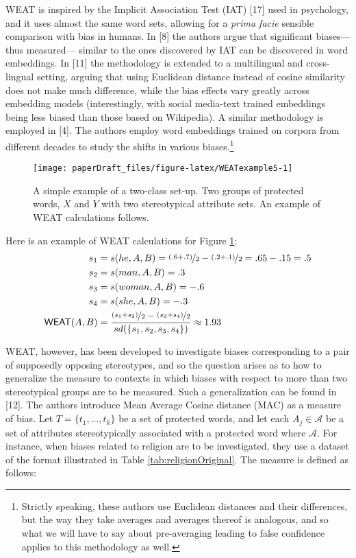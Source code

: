 \documentclass[
  12pt,
  dvipsnames,enabledeprecatedfontcommands]{scrartcl}
\begin{document}
\textsf{WEAT} is inspired by the Implicit Association Test (IAT)
{[}17{]} used in psychology, and it uses almost the same word sets,
allowing for a \emph{prima facie} sensible comparison with bias in
humans. In {[}8{]} the authors argue that significant biases---thus
measured--- similar to the ones discovered by IAT can be discovered in
word embeddings. In {[}11{]} the methodology is extended to a
multilingual and cross-lingual setting, arguing that using Euclidean
distance instead of cosine similarity does not make much difference,
while the bias effects vary greatly across embedding models
(interestingly, with social media-text trained embeddings being less
biased than those based on Wikipedia). A similar methodology is employed
in {[}4{]}. The authors employ word embeddings trained on corpora from
different decades to study the shifts in various biases.\footnote{Strictly
  speaking, these authors use Euclidean distances and their differences,
  but the way they take averages and averages thereof is analogous, and
  so what we will have to say about pre-averaging leading to false
  confidence applies to this methodology as well.}

\begin{figure}[H]

\begin{center}\texttt{[image: paperDraft\_files/figure-latex/WEATexample5-1]} \end{center}
\caption{A simple example of a two-class set-up. Two groups of protected words, $X$ and $Y$ with two stereotypical attribute sets. An example of \textsf{WEAT} calculations follows.}
\label{eq:WEATexample}
\end{figure}

\noindent Here is an example of \textsf{WEAT} calculations for Figure
\ref{eq:WEATexample}:
\begin{align*} s_1 & = s(he,A,B)  =  \nicefrac{(.6+.7)}{2}  - \nicefrac{(.2+.1)}{2} = .65-.15= .5 \\
s_2  & = s(man,A,B) = .3 \\
s_3  & = s(woman,A,B) = -.6\\
s_4 & = s(she, A, B) = -.3\\
\mathsf{WEAT}(A,B)  & = \frac{\nicefrac{(s_1+s_2)}{2} - \nicefrac{(s_3+s_4)}{2}}{sd(\{s_1,s_2,s_3,s_4\})} \approx 1.93
\end{align*}

\textsf{WEAT}, however, has been developed to investigate biases
corresponding to a pair of supposedly opposing stereotypes, and so the
question arises as to how to generalize the measure to contexts in which
biases with respect to more than two stereotypical groups are to be
measured. Such a generalization can be found in {[}12{]}. The authors
introduce Mean Average Cosine distance (\textsf{MAC}) as a measure of
bias. Let \(T = \{t_1, \dots, t_k\}\) be a set of protected words, and
let each \(A_j\in \mathcal{A}\) be a set of attributes stereotypically
associated with a protected word where \(\mathcal{A}\). For instance,
when biases related to religion are to be investigated, they use a
dataset of the format illustrated in Table \ref{tab:religionOriginal}.
The measure is defined as follows:
\end{document}
